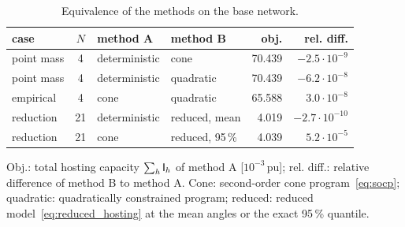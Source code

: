 \begin{table}[!b]
    \centering
    \caption{Equivalence of the methods on the base network.}
    \label{tab:equivalence}
    \setlength{\tabcolsep}{3pt}
    \scriptsize
    \begin{tabular}{l c l l r r}
        case & $N$ & method A & method B & obj. & rel. diff. \\ \hline
        point mass & 4 & deterministic & cone & 70.439 & $-2.5\cdot10^{-9}$ \\
        point mass & 4 & deterministic & quadratic & 70.439 & $-6.2\cdot10^{-8}$ \\
        empirical & 4 & cone & quadratic & 65.588 & $3.0\cdot10^{-8}$ \\
        reduction & 21 & deterministic & reduced, mean & 4.019 & $-2.7\cdot10^{-10}$ \\
        reduction & 21 & cone & reduced, 95\,\% & 4.039 & $5.2\cdot10^{-5}$ \\
    \end{tabular}
    \vspace{2pt}
    \parbox{\columnwidth}{\scriptsize Obj.: total hosting capacity $\sum_{h} \mathsf{I}_{h}$ of method A [$10^{-3}$\,pu]; rel. diff.: relative difference of method B to method A. Cone: second-order cone program~\eqref{eq:socp}; quadratic: quadratically constrained program; reduced: reduced model~\eqref{eq:reduced_hosting} at the mean angles or the exact 95\,\% quantile.}
\end{table}

